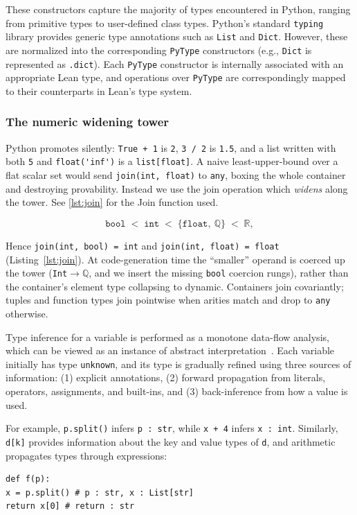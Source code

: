 \documentclass{article}
\newcommand{\code}{\lstinline}
\begin{document}
{These constructors capture the majority of types encountered in Python, ranging from primitive types to user-defined class types. Python's standard \code{typing} library provides generic type annotations such as \code{List} and \code{Dict}. However, these are normalized into the corresponding \code{PyType} constructors (e.g., \code{Dict} is represented as \code{.dict}). Each \code{PyType} constructor is internally associated with an appropriate Lean type, and operations over \code{PyType} are correspondingly mapped to their counterparts in Lean's type system.

\subsubsection{The numeric widening tower}\label{numeric-widening}
Python promotes silently: \code{True + 1} is \code{2}, \code{3 / 2} is \code{1.5}, and a list
written with both \code{5} and \code{float('inf')} is a \code{list[float]}. A naive
least-upper-bound over a flat scalar set would send \code{join(int, float)} to \code{any},
boxing the whole container and destroying provability. Instead we use the join operation which \emph{widens} along the tower. See \ref{lst:join} for the Join function used.

\[
\mathtt{bool} \;<\; \mathtt{int} \;<\; \{\mathtt{float},\ \mathbb{Q}\} \;<\; \mathbb{R},
\]

Hence \code{join(int, bool) = int} and \code{join(int, float) = float}
(Listing~\ref{lst:join}). At code-generation time the ``smaller'' operand is coerced up the
tower (\code{Int}$\to\mathbb{Q}$, and we insert the missing \code{bool} coercion rungs), rather
than the container's element type collapsing to dynamic. Containers join covariantly; tuples and
function types join pointwise when arities match and drop to \code{any} otherwise.

Type inference for a variable is performed as a monotone data-flow analysis, which can be viewed as an instance of abstract interpretation~\cite{cousot1977abstract}. Each variable initially has type \code{unknown}, and its type is gradually refined using three sources of information: (1) explicit annotations, (2) forward propagation from literals, operators, assignments, and built-ins, and (3) back-inference from how a value is used.

For example, \code{p.split()} infers \code{p : str}, while \code{x + 4} infers \code{x : int}. Similarly, \code{d[k]} provides information about the key and value types of \code{d}, and arithmetic propagates types through expressions:
\begin{lstlisting}
def f(p):
x = p.split() # p : str, x : List[str]
return x[0] # return : str
\end{lstlisting}

}
\end{document}
